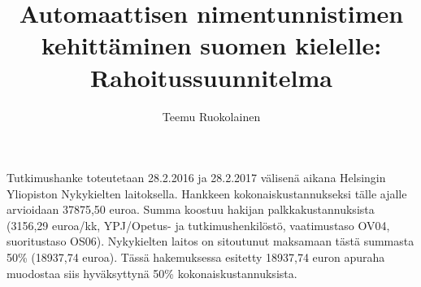 \documentclass[12pt,a4paper,finnish,oneside]{article}
\begin{document}
\title{Automaattisen nimentunnistimen kehittäminen suomen kielelle: Rahoitussuunnitelma}
\date{}
\author{Teemu Ruokolainen}


\maketitle

Tutkimushanke toteutetaan 28.2.2016 ja 28.2.2017 välisenä aikana Helsingin Yliopiston Nykykielten laitoksella. Hankkeen kokonaiskustannukseksi tälle ajalle arvioidaan 37875,50 euroa. Summa koostuu hakijan palkkakustannuksista (3156,29 euroa/kk, YPJ/Opetus- ja tutkimushenkilöstö, vaatimustaso OV04, suoritustaso OS06). Nykykielten laitos on sitoutunut maksamaan tästä summasta 50\% (18937,74 euroa). Tässä hakemuksessa esitetty 18937,74 euron apuraha muodostaa siis hyväksyttynä 50\% kokonaiskustannuksista.







\end{document}
